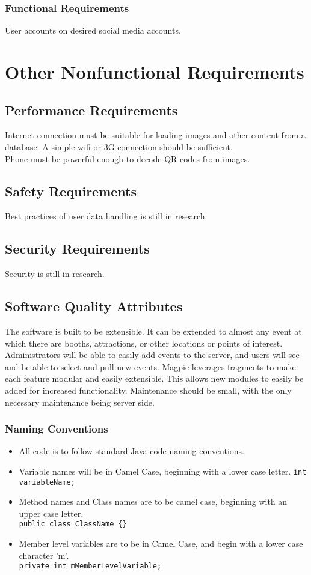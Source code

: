 \documentclass{scrreprt}
\begin{document}
\subsection{Functional Requirements}
User accounts on desired social media accounts.

\chapter{Other Nonfunctional Requirements}

\section{Performance Requirements}
Internet connection must be suitable for loading images and other content from a
database. A simple wifi or 3G connection should be sufficient. \\
Phone must be powerful enough to decode QR codes from images.

\section{Safety Requirements}
Best practices of user data handling is still in research.

\section{Security Requirements}
Security is still in research.

\section{Software Quality Attributes}
The software is built to be extensible. It can be extended to almost any event at
which there are booths, attractions, or other locations or points of interest.
Administrators will be able to easily add events to the server, and users will see
and be able to select and pull new events.
Magpie leverages fragments to make each feature modular and easily extensible.
This allows new modules to easily be added for increased functionality.
Maintenance should be small, with the only necessary maintenance being server side.

\subsection{Naming Conventions}
\begin{itemize}
\item All code is to follow standard Java code naming conventions.
\item Variable names will be in Camel Case, beginning with a lower case letter.
\texttt{int variableName;}
\item Method names and Class names are to be camel case, beginning with an upper case letter. \\
\texttt{public class ClassName \{\}}
\item Member level variables are to be in Camel Case, and begin with a lower case character 'm'. \\
\texttt{private int mMemberLevelVariable;}
\end{itemize}
\end{document}
